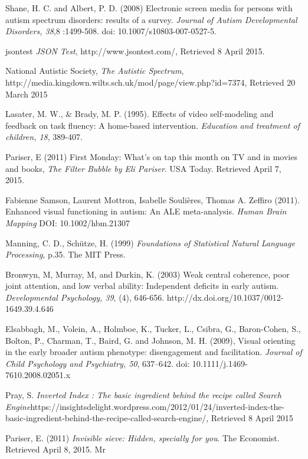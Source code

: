 \documentclass[a4paper, 10pt]{article}
\begin{document}
\begin{thebibliography}{100}
Shane, H. C. and Albert, P. D. (2008) Electronic screen media for persons with autism spectrum disorders: results of a survey. \textit{Journal of Autism Developmental Disorders, 38},8 :1499-508. doi: 10.1007/s10803-007-0527-5.

jsontest \textit{JSON Test}, http://www.jsontest.com/, Retrieved 8 April 2015.

National Autistic Society, \textit{The Autistic Spectrum}, \\http://media.kingdown.wilts.sch.uk/mod/page/view.php?id=7374, Retrieved 20 March 2015

Lasater, M. W., \& Brady, M. P. (1995). Effects of video self-modeling and feedback on task fluency: A home-based intervention. \textit{Education and treatment of children, 18}, 389-407.

 Pariser, E (2011) First Monday: What's on tap this month on TV and in movies and books, \textit{The Filter Bubble by Eli Pariser}. USA Today. Retrieved April 7, 2015. 

Fabienne Samson, Laurent Mottron, Isabelle Soulières, Thomas A. Zeffiro (2011). Enhanced visual functioning in autism: An ALE meta-analysis. \textit{Human Brain Mapping} DOI: 10.1002/hbm.21307

Manning, C. D., Schütze, H. (1999) \textit{Foundations of Statistical Natural Language Processing}, p.35. The MIT Press.

 Bronwyn, M, Murray, M, and Durkin, K. (2003) Weak central coherence, poor joint attention, and low verbal ability: Independent deficits in early autism. \textit{Developmental Psychology, 39}, (4), 646-656. http://dx.doi.org/10.1037/0012-1649.39.4.646

Elsabbagh, M., Volein, A., Holmboe, K., Tucker, L., Csibra, G., Baron-Cohen, S., Bolton, P., Charman, T., Baird, G. and Johnson, M. H. (2009), Visual orienting in the early broader autism phenotype: disengagement and facilitation. \textit{Journal of Child Psychology and Psychiatry, 50}, 637–642. doi: 10.1111/j.1469-7610.2008.02051.x

 Pray, S. \textit{Inverted Index : The basic ingredient behind the recipe called Search Engine}https://insightsdelight.wordpress.com/2012/01/24/inverted-index-the-basic-ingredient-behind-the-recipe-called-search-engine/, Retrieved 8 April 2015

 Pariser, E. (2011) \textit{Invisible sieve: Hidden, specially for you}. The Economist. Retrieved April 8, 2015. Mr 


\end{thebibliography}
\end{document}

